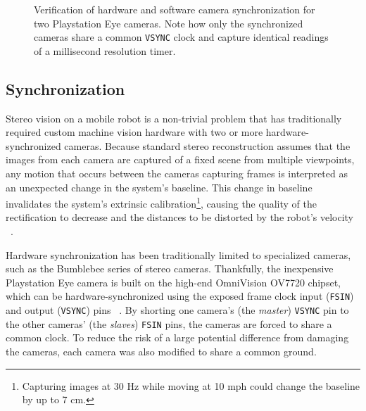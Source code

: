 \documentclass[twocolumn,11pt]{article}
\begin{document}
\begin{figure*}[t]
	\centering
	\caption{
		Verification of hardware and software camera synchronization for two
		Playstation Eye cameras. Note how only the synchronized cameras share a
		common \texttt{VSYNC} clock and capture identical readings of a
		millisecond resolution timer.
	}
	\label{fig:stereo-sync}
\end{figure*}

\subsection{Synchronization}
\label{sec:stereo-sync}
Stereo vision on a mobile robot is a non-trivial problem that has traditionally
required custom machine vision hardware with two or more hardware-synchronized
cameras. Because standard stereo reconstruction assumes that the images from
each camera are captured of a fixed scene from multiple viewpoints, any motion
that occurs between the cameras capturing frames is interpreted as an
unexpected change in the system's baseline. This change in baseline invalidates
the system's extrinsic calibration\footnote{Capturing images at 30 Hz while
moving at 10 mph could change the baseline by up to 7 cm.}, causing the quality
of the rectification to decrease and the distances to be distorted by the
robot's velocity ~\cite{unsync}.

Hardware synchronization has been traditionally limited to specialized cameras,
such as the Bumblebee series of stereo cameras. Thankfully, the inexpensive
Playstation Eye camera is built on the high-end OmniVision OV7720 chipset,
which can be hardware-synchronized using the exposed frame clock input
(\texttt{FSIN}) and output (\texttt{VSYNC}) pins ~\cite{omnivision}. By
shorting one camera's (the \textit{master}) \texttt{VSYNC} pin to the other
cameras' (the \textit{slaves}) \texttt{FSIN} pins, the cameras are forced to
share a common clock. To reduce the risk of a large potential difference from
damaging the cameras, each camera was also modified to share a common ground.
\end{document}
